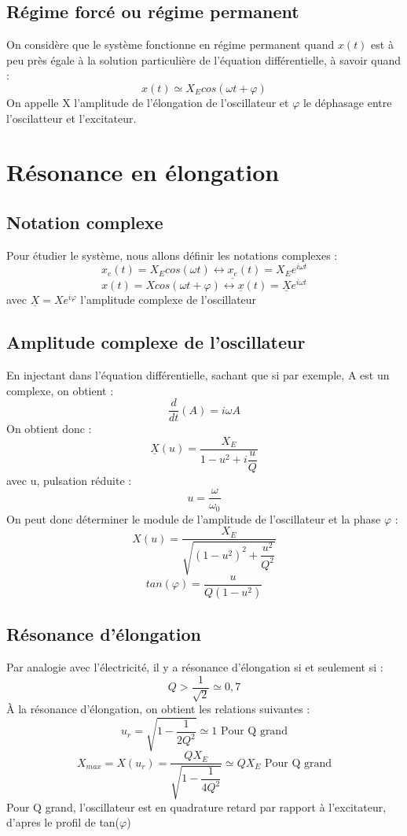 \subsection{Régime forcé ou régime permanent}
\begin{de}
On considère que le système fonctionne en régime permanent quand $x(t)$ est à peu près égale à la solution particulière de l'équation différentielle, à savoir quand :
$$x(t) \simeq X_Ecos(\omega t+\varphi)$$
On appelle X l'amplitude de l'élongation de l'oscillateur et $\varphi$ le déphasage entre l'oscilatteur et l'excitateur.
\end{de}
\section{Résonance en élongation}
\subsection{Notation complexe}
Pour étudier le système, nous allons définir les notations complexes :
$$x_e(t) = X_E cos(\omega t) \leftrightarrow \underline{x_e}(t) = X_E e^{i\omega t}$$
$$x(t) = X cos(\omega t + \varphi) \leftrightarrow \underline{x}(t) = \underline{X}e^{i\omega t}$$
avec $\underline{X} = Xe^{i\varphi}$ l'amplitude complexe de l'oscillateur
\subsection{Amplitude complexe de l'oscillateur}
En injectant dans l'équation différentielle, sachant que si par exemple, A est un complexe, on obtient :
$$\dfrac{d}{dt}(A) = i\omega A$$
On obtient donc :
$$\underline{X}(u) = \dfrac{X_E}{1-u^2+i\dfrac{u}{Q}}$$
avec u, pulsation réduite :
$$u = \dfrac{\omega}{\omega_0}$$
On peut donc déterminer le module de l'amplitude de l'oscillateur et la phase $\varphi$ :
$$X(u) = \dfrac{X_E}{\sqrt{(1-u^2)^2 + \dfrac{u^2}{Q^2}}}$$
$$tan(\varphi) = \dfrac{u}{Q(1-u^2)}$$
\subsection{Résonance d'élongation}
Par analogie avec l'électricité, il y a résonance d'élongation si et seulement si :
$$Q > \dfrac{1}{\sqrt{2}} \simeq 0,7$$
À la résonance d'élongation, on obtient les relations suivantes :
$$u_{r} = \sqrt{1 - \dfrac{1}{2Q^2}} \simeq 1 \mbox{ Pour Q grand}$$
$$X_{max} = X(u_r) = \dfrac{QX_E}{\sqrt{1 - \dfrac{1}{4Q^2}}} \simeq QX_E \mbox{ Pour Q grand}$$
Pour Q grand, l'oscillateur est en quadrature retard par rapport à l'excitateur, d'apres le profil de tan($\varphi$) 
